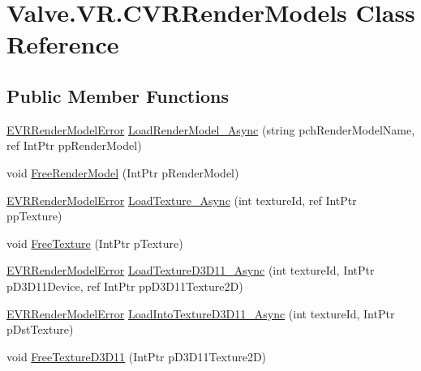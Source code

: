 \hypertarget{class_valve_1_1_v_r_1_1_c_v_r_render_models}{}\section{Valve.\+V\+R.\+C\+V\+R\+Render\+Models Class Reference}
\label{class_valve_1_1_v_r_1_1_c_v_r_render_models}
\subsection*{Public Member Functions}
\begin{DoxyCompactItemize}
\item 
\mbox{\hyperlink{namespace_valve_1_1_v_r_ac95dda09bbb588fd83a8ac0ba3c82266}{E\+V\+R\+Render\+Model\+Error}} \mbox{\hyperlink{class_valve_1_1_v_r_1_1_c_v_r_render_models_a6be099382011169eae6acb8d374ceae9}{Load\+Render\+Model\+\_\+\+Async}} (string pch\+Render\+Model\+Name, ref Int\+Ptr pp\+Render\+Model)
\item 
void \mbox{\hyperlink{class_valve_1_1_v_r_1_1_c_v_r_render_models_ad36fe11f2fe3aeac575a5e48daaa12e1}{Free\+Render\+Model}} (Int\+Ptr p\+Render\+Model)
\item 
\mbox{\hyperlink{namespace_valve_1_1_v_r_ac95dda09bbb588fd83a8ac0ba3c82266}{E\+V\+R\+Render\+Model\+Error}} \mbox{\hyperlink{class_valve_1_1_v_r_1_1_c_v_r_render_models_af399586b6d1e2baffab9c62e3f5e0a6f}{Load\+Texture\+\_\+\+Async}} (int texture\+Id, ref Int\+Ptr pp\+Texture)
\item 
void \mbox{\hyperlink{class_valve_1_1_v_r_1_1_c_v_r_render_models_ae2431db2c9cb3de9c208315c71b974e0}{Free\+Texture}} (Int\+Ptr p\+Texture)
\item 
\mbox{\hyperlink{namespace_valve_1_1_v_r_ac95dda09bbb588fd83a8ac0ba3c82266}{E\+V\+R\+Render\+Model\+Error}} \mbox{\hyperlink{class_valve_1_1_v_r_1_1_c_v_r_render_models_ab3a742c51f8ca3f667b99d8cdbadd366}{Load\+Texture\+D3\+D11\+\_\+\+Async}} (int texture\+Id, Int\+Ptr p\+D3\+D11\+Device, ref Int\+Ptr pp\+D3\+D11\+Texture2D)
\item 
\mbox{\hyperlink{namespace_valve_1_1_v_r_ac95dda09bbb588fd83a8ac0ba3c82266}{E\+V\+R\+Render\+Model\+Error}} \mbox{\hyperlink{class_valve_1_1_v_r_1_1_c_v_r_render_models_ac30a0d95adaa26064a9e52ca97241bdc}{Load\+Into\+Texture\+D3\+D11\+\_\+\+Async}} (int texture\+Id, Int\+Ptr p\+Dst\+Texture)
\item 
void \mbox{\hyperlink{class_valve_1_1_v_r_1_1_c_v_r_render_models_a3c553e473aea38d521f81ca755f3ee38}{Free\+Texture\+D3\+D11}} (Int\+Ptr p\+D3\+D11\+Texture2D)

\end{DoxyCompactItemize}
